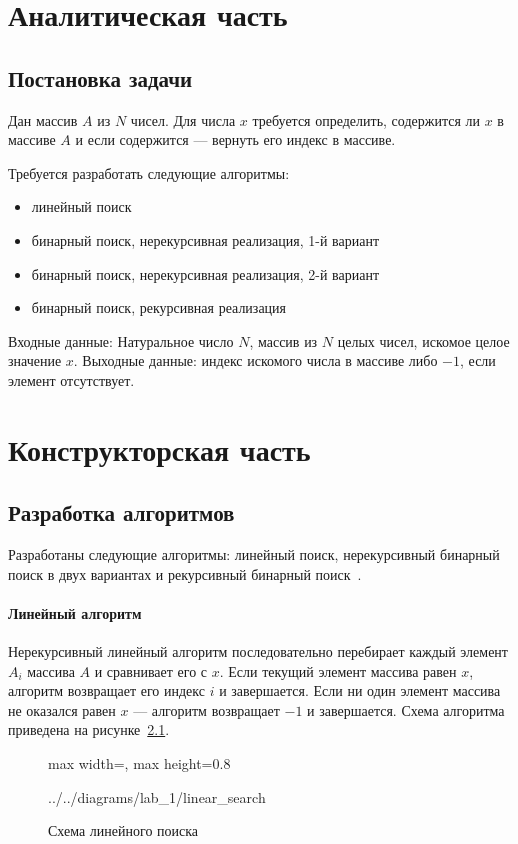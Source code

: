 \documentclass{bmstu}
\begin{document}
\chapter{Аналитическая часть}

\section{Постановка задачи}
Дан массив $A$ из $N$ чисел. Для числа $x$ требуется определить,
содержится ли $x$ в массиве $A$ и если содержится --- вернуть его
индекс в массиве.

Требуется разработать следующие алгоритмы:
\begin{itemize}
	\item линейный поиск
	\item бинарный поиск, нерекурсивная реализация, 1-й вариант
	\item бинарный поиск, нерекурсивная реализация, 2-й вариант
	\item бинарный поиск, рекурсивная реализация
\end{itemize}

Входные данные: Натуральное число $N$, массив из $N$ целых чисел,
искомое целое значение $x$. Выходные данные: индекс искомого числа в массиве
либо $-1$, если элемент отсутствует.

\chapter{Конструкторская часть}

\section{Разработка алгоритмов}
Разработаны следующие алгоритмы: линейный поиск, нерекурсивный
бинарный поиск в двух вариантах и рекурсивный бинарный поиск~\cite{knuth1998art}.

\subsubsection{Линейный алгоритм}
Нерекурсивный линейный алгоритм последовательно перебирает каждый элемент
$A_i$ массива $A$ и сравнивает его с $x$. Если текущий элемент массива равен $x$,
алгоритм возвращает его индекс $i$ и завершается. Если ни один элемент массива
не оказался равен $x$ --- алгоритм возвращает $-1$ и завершается. Схема
алгоритма приведена на рисунке~\ref{fig:linear-search}.

\begin{figure}[H]
	\centering
	\begin{adjustbox}{max width=\textwidth, max height=0.8\textheight}
		
		{../../diagrams/lab_1/linear_search}
	\end{adjustbox}
	\caption{Схема линейного поиска}
	\label{fig:linear-search}
\end{figure}
\end{document}
